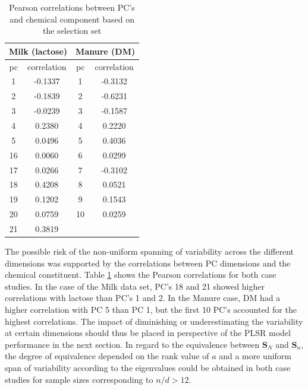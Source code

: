 \documentclass[journal=ancham,manuscript=article]{achemso}
\begin{document}
\begin{table}[t]
\centering
\begin{tabular}{|cc|cc|} 
\hline
\multicolumn{2}{|c|}{Milk (lactose)} & \multicolumn{2}{|c|}{Manure (DM)}\\
\hline
pc	& correlation	&  pc & correlation	\\
\hline
  1 & -0.1337 & 1 & -0.3132 \\
  2 & -0.1839 & 2 & -0.6231 \\
  3 & -0.0239 & 3 & -0.1587 \\
  4 &  0.2380 & 4 &  0.2220 \\
  5 &  0.0496 & 5 &  0.4036 \\
 16 &  0.0060 & 6 &  0.0299 \\
 17 &  0.0266 & 7 & -0.3102 \\
 18 &  0.4208 & 8 & 0.0521 \\
 19 &  0.1202 & 9 & 0.1543 \\
 20 &  0.0759 & 10& 0.0259 \\
 21 &  0.3819 &  & \\
 \hline
\end{tabular}
\caption{Pearson correlations between PC's and chemical component based on the selection set}
\label{tab_correlations}
\end{table}

The possible risk of the non-uniform spanning of variability across the different dimensions was supported by the correlations between PC dimensions and the chemical constituent. Table \ref{tab_correlations} shows the Pearson correlations for both case studies. In the case of the Milk data set, PC's 18 and 21 showed higher correlations with lactose than PC's 1 and 2. In the Manure case, DM had a higher correlation with PC 5 than PC 1, but the first 10 PC's accounted for the highest correlations. The impact of diminishing or underestimating the variability at certain dimensions should thus be placed in perspective of the PLSR model performance in the next section. In regard to the equivalence between $\mathbf{S}_N$ and $\mathbf{S}_n$, the degree of equivalence depended on the rank value of $a$ and a more uniform span of variability according to the eigenvalues could be obtained in both case studies for sample sizes corresponding to $n/d>12$.  
\end{document}
